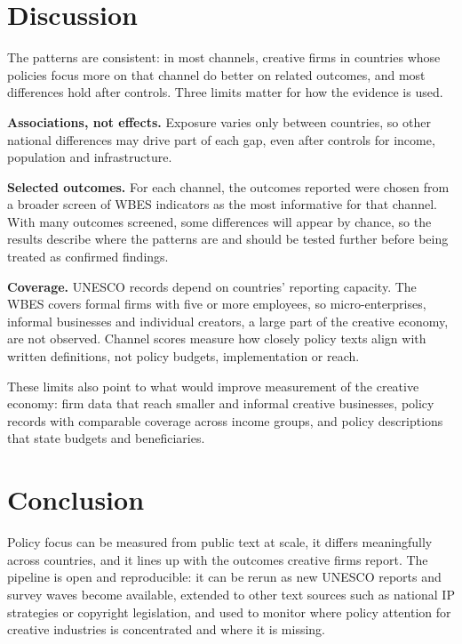 \documentclass[11pt]{article}
\begin{document}
\section{Discussion}\label{sec:disc}

The patterns are consistent: in most channels, creative firms in countries whose policies focus more on that channel do better on related outcomes, and most differences hold after controls. Three limits matter for how the evidence is used.

\textbf{Associations, not effects.} Exposure varies only between countries, so other national differences may drive part of each gap, even after controls for income, population and infrastructure.

\textbf{Selected outcomes.} For each channel, the outcomes reported were chosen from a broader screen of WBES indicators as the most informative for that channel. With many outcomes screened, some differences will appear by chance, so the results describe where the patterns are and should be tested further before being treated as confirmed findings.

\textbf{Coverage.} UNESCO records depend on countries' reporting capacity. The WBES covers formal firms with five or more employees, so micro-enterprises, informal businesses and individual creators, a large part of the creative economy, are not observed. Channel scores measure how closely policy texts align with written definitions, not policy budgets, implementation or reach.

These limits also point to what would improve measurement of the creative economy: firm data that reach smaller and informal creative businesses, policy records with comparable coverage across income groups, and policy descriptions that state budgets and beneficiaries.

\section{Conclusion}

Policy focus can be measured from public text at scale, it differs meaningfully across countries, and it lines up with the outcomes creative firms report. The pipeline is open and reproducible: it can be rerun as new UNESCO reports and survey waves become available, extended to other text sources such as national IP strategies or copyright legislation, and used to monitor where policy attention for creative industries is concentrated and where it is missing.
\end{document}
